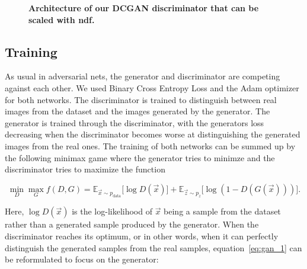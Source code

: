             \begin{figure}[ht]
                \centering
                \caption[DCGAN discriminator architecture]
                {
                    \textbf{Architecture of our DCGAN discriminator that can be scaled with ndf.}
                }
                \label{fig:architecture_dcgan_ours_discriminator}
            \end{figure}

        \subsection{Training}
            As usual in adversarial nets, the generator and discriminator are competing against each other. We used Binary Cross Entropy Loss and the Adam optimizer for both networks. The discriminator is trained to distinguish between real images from the dataset and the images generated by the generator. The generator is trained through the discriminator, with the generators loss decreasing when the discriminator becomes worse at distinguishing the generated images from the real ones. The training of both networks can be summed up by the following minimax game where the generator tries to minimze and the discriminator tries to maximize the function~\cite{gan}

            \begin{equation}
                \min_D \max_G f(D, G) =
                \mathbb{E}_{\vec{x} \sim p_{\text{data}}}
                    \bigl[ \log D(\vec{x}) \bigr] +
                \mathbb{E}_{\vec{z} \sim p_z}
                    \bigl[ \log \left( 1 - D(G(\vec{x})) \right) \bigr].
                \label{eq:gan_1}
            \end{equation}

            Here, $\log D(\vec{x})$ is the log-likelihood of $\vec{x}$ being a sample from the dataset rather than a generated sample produced by the generator. When the discriminator reaches its optimum, or in other words, when it can perfectly distinguish the generated samples from the real samples, equation~\ref{eq:gan_1} can be reformulated to focus on the generator:

